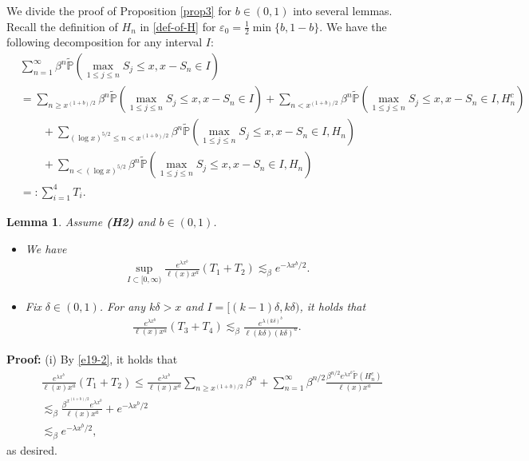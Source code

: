 \documentclass[11pt]{article}
\newtheorem{lemma}[thrm]{Lemma}
\numberwithin{equation}{section}
\begin{document}
We divide the proof of Proposition \ref{prop3} for $b\in (0,1)$ into several lemmas. 
Recall the definition of $H_n$ in \eqref{def-of-H} for $\varepsilon_0= \frac{1}{2}\min\{ b, 1-b\}$. 
We have the following decomposition for any interval $I$:
\begin{align}\label{decomposition}
	&  \sum_{n=1}^\infty \beta^{n}\widetilde{\mathbb{P}}\left(\max_{1\leq j \leq n} S_j \leq x, x-S_n\in I \right) \nonumber\\
	&=  \sum_{n\geq x^{(1+b)/2}} \beta^{n}\widetilde{\mathbb{P}}\left(\max_{1\leq j \leq n} S_j \leq x, x-S_n\in I \right) + \sum_{n<x^{(1+b)/2}}  \beta^{n}\widetilde{\mathbb{P}}\left(\max_{1\leq j \leq n} S_j \leq x, x-S_n\in I, H_n^c\right) \nonumber\\
	&\qquad + \sum_{(\log x)^{5/2}\leq n <x^{(1+b)/2}} \beta^{n}\widetilde{\mathbb{P}}\left(\max_{1\leq j \leq n} S_j \leq x, x-S_n\in I, H_n \right) \nonumber\\
	&\qquad + \sum_{n< (\log x)^{5/2} } \beta^{n}\widetilde{\mathbb{P}}\left(\max_{1\leq j \leq n} S_j \leq x, x-S_n\in I, H_n \right) \nonumber\\
	&=: \sum_{i=1}^4 T_i. 
\end{align}


\begin{lemma}\label{lem5-1}
	Assume {\bf(H2)} and $b\in (0,1)$. 
	\begin{itemize}
		\item[(i)] We have 
		\begin{align}
			\sup_{I\subset [0,\infty)}  \frac{e^{\lambda x^b}}{\ell(x)x^a }(T_1+T_2) \lesssim_\beta  e^{-\lambda x^{b}/2}.
		\end{align}
		\item[(ii)] Fix $\delta\in (0,1)$. For any $k\delta >x$ and $I= [(k-1)\delta, k\delta)$, it holds that 
		\begin{align}
		\frac{e^{\lambda x^b}}{\ell(x)x^a }(T_3+T_4)  \lesssim_\beta \frac{e^{ \lambda (k\delta)^b }}{\ell(k\delta)(k\delta)^a}.
		\end{align}
	\end{itemize}
\end{lemma}
\textbf{Proof: }
(i) By \eqref{e19-2}, it holds that 
\begin{align}
	& \frac{e^{\lambda x^b}}{\ell(x)x^a }(T_1+T_2)  \leq  \frac{e^{\lambda x^b}}{\ell(x)x^a } \sum_{n\geq x^{(1+b)/2}} \beta^{n} +\sum_{n=1}^\infty \beta^{n/2} \frac{ \beta^{n/2}e^{\lambda x^b}\widetilde{\mathbb{P}}\left(  H_n^c\right)}{\ell(x)x^a } \nonumber\\
	&\lesssim_\beta \frac{\beta^{x^{(1+b)/2}}e^{\lambda x^b}}{\ell(x)x^a }+ e^{-\lambda x^b/2} \nonumber\\
	&\lesssim_\beta  e^{-\lambda x^b/2},
\end{align}
as desired. 
\end{document}
